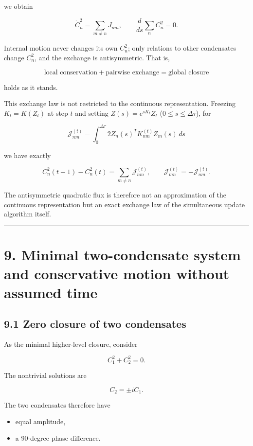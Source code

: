 \documentclass[
  a4paper,
]{article}
\providecommand{\tightlist}{%
  \setlength{\itemsep}{0pt}\setlength{\parskip}{0pt}}
\begin{document}
we obtain

\[
\boxed{
\dot C_n^2
=
\sum_{m\ne n}J_{nm}
},
\qquad
\frac{d}{ds}\sum_nC_n^2=0.
\]

Internal motion never changes its own \(C_n^2\); only relations to other
condensates change \(C_n^2\), and the exchange is antisymmetric. That
is,

\[
\boxed{
\text{local conservation}
+
\text{pairwise exchange}
=
\text{global closure}
}
\]

holds as it stands.

This exchange law is not restricted to the continuous representation.
Freezing \(K_t=K(Z_t)\) at step \(t\) and setting \(Z(s)=e^{sK_t}Z_t\)
(\(0\le s\le\Delta\tau\)), for

\[
\mathcal J_{nm}^{(t)}
=
\int_0^{\Delta\tau}
2Z_n(s)^T K_{nm}^{(t)}Z_m(s)\,ds
\]

we have exactly

\[
\boxed{
C_n^2(t+1)-C_n^2(t)
=
\sum_{m\ne n}\mathcal J_{nm}^{(t)}
},
\qquad
\boxed{
\mathcal J_{mn}^{(t)}=-\mathcal J_{nm}^{(t)}
}.
\]

The antisymmetric quadratic flux is therefore not an approximation of
the continuous representation but an exact exchange law of the
simultaneous update algorithm itself.

\begin{center}\rule{0.5\linewidth}{0.5pt}\end{center}

\section{9. Minimal two-condensate system and conservative motion
without assumed
time}\label{minimal-two-condensate-system-and-conservative-motion-without-assumed-time}

\subsection{9.1 Zero closure of two
condensates}\label{zero-closure-of-two-condensates}

As the minimal higher-level closure, consider

\[
\boxed{
C_1^2+C_2^2=0
}.
\]

The nontrivial solutions are

\[
C_2=\pm iC_1.
\]

The two condensates therefore have

\begin{itemize}
\tightlist
\item
  equal amplitude,
\item
  a 90-degree phase difference.
\end{itemize}
\end{document}
